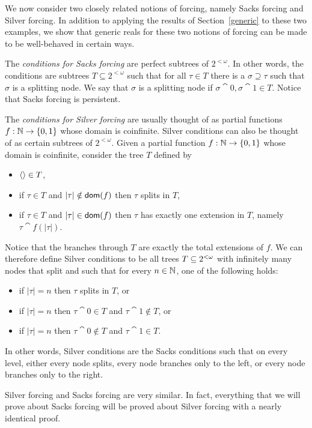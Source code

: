 We now consider two closely related notions of forcing,
namely Sacks forcing and Silver forcing.
In addition to applying the results of Section~\ref{generic}
to these two examples, we show that generic reals
for these two notions of forcing can be made to be well-behaved in certain ways.

The \textit{conditions for Sacks forcing} are perfect subtrees of $2^{<\omega}$.
In other words, the conditions are subtrees $T\subseteq 2^{<\omega}$
such that for all $\tau\in T$ there is a $\sigma\supseteq\tau$ such that
$\sigma$ is a splitting node.
We say that $\sigma$ is a splitting node if
$\sigma\cat{0},\sigma\cat{1}\in T$.
Notice that Sacks forcing is persistent.

The \textit{conditions for Silver forcing} are usually thought of as
partial functions $f:\mathbb{N}\to\{0,1\}$ whose domain is coinfinite.
Silver conditions can also be thought of as certain subtrees of $2^{<\omega}$.
Given a partial function $f:\mathbb{N}\to\{0,1\}$ whose domain is coinfinite,
consider the tree $T$ defined by
\begin{itemize}
\item $\left\langle \right\rangle\in T$,
\item if $\tau\in T$ and $|\tau|\notin\mathsf{dom}(f)$ then $\tau$ splits in $T$,
\item if $\tau\in T$ and $|\tau|\in\mathsf{dom}(f)$ then $\tau$ has exactly one extension
	in $T$, namely $\tau\cat{f(|\tau|)}$.
\end{itemize}
Notice that the branches through $T$ are exactly the total extensions of $f$.
We can therefore define Silver conditions to be all trees $T\subseteq 2^{<\omega}$
with infinitely many nodes that split and such that for every $n\in\mathbb{N}$,
one of the following holds:
\begin{itemize}
\item if $|\tau|=n$ then $\tau$ splits in $T$, or
\item if $|\tau|=n$ then $\tau\cat{0}\in T$ and $\tau\cat{1}\notin T$, or
\item if $|\tau|=n$ then $\tau\cat{0}\notin T$ and $\tau\cat{1}\in T$.
\end{itemize}
In other words, Silver conditions are the Sacks conditions such that
on every level, either every node splits, every node branches only to the left,
or every node branches only to the right.

Silver forcing and Sacks forcing are very similar.
In fact, everything that we will prove about Sacks
forcing will be proved about Silver forcing with a nearly identical proof.

